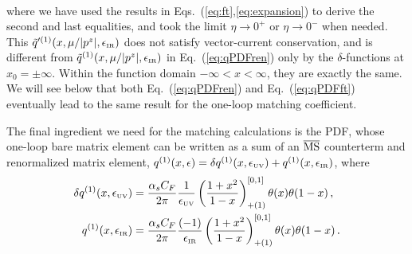 \documentclass[prd,aps,twocolumn,preprintnumbers,showpacs,nofootinbib,superscriptaddress,notitlepage]{revtex4-1}
\newcommand{\nn}{\nonumber}
\DeclareRobustCommand{\eq}[1]{Eq.~(\ref{eq:#1})}
\begin{document}
\begin{widetext}
\begin{align}
\end{align}
where we have used the results in Eqs.~(\ref{eq:ft},\ref{eq:expansion}) to derive the second and last equalities, and took the limit $\eta\to 0^+$ or $\eta\to 0^-$ when needed.  This $\tilde{q}'^{(1)}(x,\mu/|p^z|,\epsilon_{\mbox{\tiny IR}})$ does not satisfy vector-current conservation, and is different from $\tilde{q}^{(1)}(x,\mu/|p^z|,\epsilon_{\mbox{\tiny IR}})$ in \eq{qPDFren} only by the $\delta$-functions at $x_0=\pm\infty$. Within the function domain $-\infty < x < \infty$, they are exactly the same.  We will see below that both \eq{qPDFren} and \eq{qPDFft} eventually lead to the same result for the one-loop matching coefficient.


The final ingredient we need for the matching calculations is the PDF, whose one-loop bare matrix element can be written as a sum of an $\overline{\rm MS}$ counterterm and renormalized matrix element, $q^{(1)}(x,\epsilon) = \delta q^{(1)}(x,\epsilon_{\mbox{\tiny UV}})+q^{(1)}(x,\epsilon_{\mbox{\tiny IR}})$, where
\begin{align}
 \delta q^{(1)}(x,\epsilon_{\mbox{\tiny UV}}) &= 	{\alpha_sC_F\over 2\pi} {1\over \epsilon_{\mbox{\tiny UV}}} \left({1+x^2\over 1-x}\right)^{[0,1]}_{+(1)}  \theta(x)\theta(1-x)
  \,, \\
 q^{(1)}(x,\epsilon_{\mbox{\tiny IR}}) &= 	{\alpha_sC_F\over 2\pi} {(-1)\over \epsilon_{\mbox{\tiny IR}}} \left({1+x^2\over 1-x}\right)^{[0,1]}_{+(1)} \theta(x)\theta(1-x)
  \,. \nn
\end{align}
	

\end{widetext}
\end{document}
